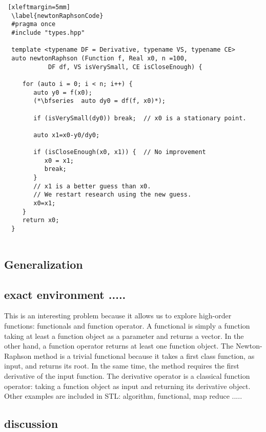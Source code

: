 \documentclass[12pt]{article}
\begin{document}
  
  \begin{lstlisting} [xleftmargin=5mm]
  \label{newtonRaphsonCode}
  #pragma once
  #include "types.hpp"
  
  template <typename DF = Derivative, typename VS, typename CE> 
  auto newtonRaphson (Function f, Real x0, n =100, 
  		    DF df, VS isVerySmall, CE isCloseEnough) {
  
     for (auto i = 0; i < n; i++) {
        auto y0 = f(x0);
        (*\bfseries  auto dy0 = df(f, x0)*);
  
        if (isVerySmall(dy0)) break;  // x0 is a stationary point.
        
        auto x1=x0-y0/dy0;
            
        if (isCloseEnough(x0, x1)) {  // No improvement 
           x0 = x1; 
           break;
        }   
        // x1 is a better guess than x0.
        // We restart research using the new guess.
        x0=x1;
     }   
     return x0; 
  }
  
  \end{lstlisting}
  
   \subsection {Generalization}
   \citet*{meyers2014effective} 
  \subsection {exact environment .....}
  
  This is an interesting problem because it allows us to explore high-order functions: functionals and function operator.
  A functional is simply a function taking at least a function object as a parameter and returns a vector.  In the other hand, a function operator returns at least one function object.
  The Newton-Raphson method is a trivial functional because it takes a first class function, as input,  and returns its root.  In the same time, the method requires the first derivative of the input function.  
  The derivative operator is a classical function operator: taking a function object as input and returning its derivative object. 
  Other examples are included in STL: algorithm, functional, map reduce .....
  \subsection {discussion}
  
\end{document}
